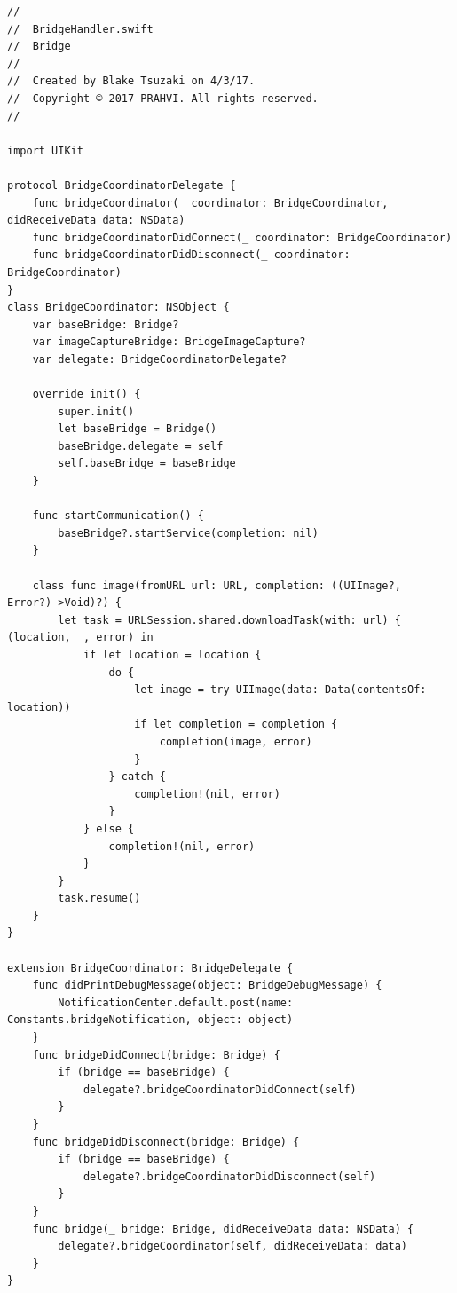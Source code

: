 \begin{lstlisting}
//
//  BridgeHandler.swift
//  Bridge
//
//  Created by Blake Tsuzaki on 4/3/17.
//  Copyright © 2017 PRAHVI. All rights reserved.
//

import UIKit

protocol BridgeCoordinatorDelegate {
    func bridgeCoordinator(_ coordinator: BridgeCoordinator, didReceiveData data: NSData)
    func bridgeCoordinatorDidConnect(_ coordinator: BridgeCoordinator)
    func bridgeCoordinatorDidDisconnect(_ coordinator: BridgeCoordinator)
}
class BridgeCoordinator: NSObject {
    var baseBridge: Bridge?
    var imageCaptureBridge: BridgeImageCapture?
    var delegate: BridgeCoordinatorDelegate?
    
    override init() {
        super.init()
        let baseBridge = Bridge()
        baseBridge.delegate = self
        self.baseBridge = baseBridge
    }
    
    func startCommunication() {
        baseBridge?.startService(completion: nil)
    }
    
    class func image(fromURL url: URL, completion: ((UIImage?, Error?)->Void)?) {
        let task = URLSession.shared.downloadTask(with: url) { (location, _, error) in
            if let location = location {
                do {
                    let image = try UIImage(data: Data(contentsOf: location))
                    if let completion = completion {
                        completion(image, error)
                    }
                } catch {
                    completion!(nil, error)
                }
            } else {
                completion!(nil, error)
            }
        }
        task.resume()
    }
}

extension BridgeCoordinator: BridgeDelegate {
    func didPrintDebugMessage(object: BridgeDebugMessage) {
        NotificationCenter.default.post(name: Constants.bridgeNotification, object: object)
    }
    func bridgeDidConnect(bridge: Bridge) {
        if (bridge == baseBridge) {
            delegate?.bridgeCoordinatorDidConnect(self)
        }
    }
    func bridgeDidDisconnect(bridge: Bridge) {
        if (bridge == baseBridge) {
            delegate?.bridgeCoordinatorDidDisconnect(self)
        }
    }
    func bridge(_ bridge: Bridge, didReceiveData data: NSData) {
        delegate?.bridgeCoordinator(self, didReceiveData: data)
    }
}
\end{lstlisting}

